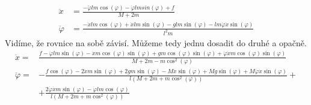 \documentclass[a4paper, 12pt]{article}
\begin{document}
			\begin{align*}
				\ddot{x} &= \frac{-\ddot{\varphi}lm\cos(\varphi)-\dot{\varphi}lmsin(\varphi)+f}{M+2m}\\
				\ddot{\varphi} &= \frac{-\ddot{x}lm\cos(\varphi)+\dot{x}lm\sin(\varphi)-glm\sin(\varphi)-lm\dot{\varphi}\dot{x}\sin(\varphi)}{l^2m}
			\end{align*}
			Vidíme, že rovnice na sobě závisí. Můžeme tedy jednu dosadit do druhé a opačně.
			\begin{align*}
				\ddot{x} = &\frac{f-\dot{\varphi}lm\sin(\varphi)-\dot{x}m\cos(\varphi)\sin(\varphi)+gm\cos(\varphi)\sin(\varphi)+\dot{\varphi}\dot{x}m\cos(\varphi)\sin(\varphi)}{M+2m-m\cos^2(\varphi)}\\
				\ddot{\varphi} = &-\frac{f\cos(\varphi)-2\dot{x}m\sin(\varphi)+2gm\sin(\varphi)-M\dot{x}\sin(\varphi)+Mg\sin(\varphi)+M\dot{\varphi}\dot{x}\sin(\varphi)}{l(M+2m+m\cos^2(\varphi))}+\\&+\frac{2\dot{\varphi}\dot{x}m\sin(\varphi)-\dot{\varphi}lm\cos(\varphi)}{l(M+2m+m\cos^2(\varphi))}
			\end{align*}
\end{document}
